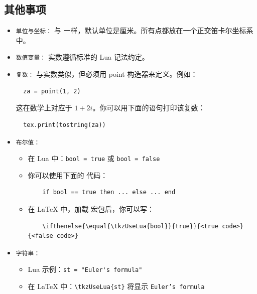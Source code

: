 \subsection{其他事项}
\label{sub:miscellanous}
\begin{itemize}
  \item \texttt{单位与坐标：} 与  一样，默认单位是厘米。所有点都放在一个正交笛卡尔坐标系中。

  \item \texttt{数值变量：} 实数遵循标准的 Lua 记法约定。

  \item \texttt{复数：} 与实数类似，但必须用 point 构造器来定义。例如：
  \begin{verbatim}
  za = point(1, 2)
  \end{verbatim}
  这在数学上对应于 \(1 + 2i\)。你可以用下面的语句打印该复数：
  \begin{verbatim}
  tex.print(tostring(za))
  \end{verbatim}

  \item \texttt{布尔值：}
  \begin{itemize}
    \item 在 Lua 中：\verb|bool = true| 或 \verb|bool = false|
    \item 你可以使用下面的  代码：
    \begin{verbatim}
    if bool == true then ... else ... end
    \end{verbatim}
    \item 在 LaTeX 中，加载  宏包后，你可以写：
    \begin{verbatim}
    \ifthenelse{\equal{\tkzUseLua{bool}}{true}}{<true code>}{<false code>}
    \end{verbatim}
  \end{itemize}

  \item \texttt{字符串：}
  \begin{itemize}
    \item Lua 示例：\verb|st = "Euler's formula"|
    \item 在 LaTeX 中：\verb|\tkzUseLua{st}| 将显示 \texttt{Euler's formula}
  \end{itemize}
\end{itemize}
\endinput